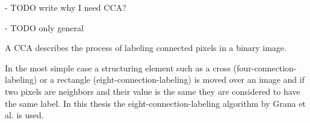 - TODO write why I need CCA?

- TODO only general

A \ac{CCA} describes the process of labeling connected pixels in a binary image.

In the most simple case a structuring element such as a cross (four-connection-labeling) or a rectangle (eight-connection-labeling) is moved over an image and if two pixels are neighbors and their value is the same they are considered to have the same label. In this thesis the eight-connection-labeling algorithm by Grana et al. \cite{cca} is used.
